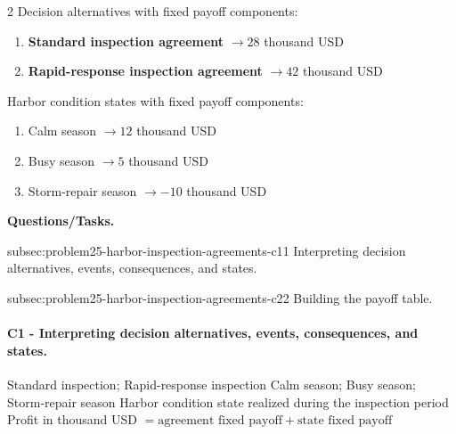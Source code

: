 	\begin{multicols}{2}
		Decision alternatives with fixed payoff components:
		\begin{enumerate}[label=\arabic*.]
			\item \textbf{Standard inspection agreement} $\to 28$ thousand USD
			\item \textbf{Rapid-response inspection agreement} $\to 42$ thousand USD
		\end{enumerate}

			\columnbreak

		Harbor condition states with fixed payoff components:
		\begin{enumerate}[label=\arabic*.]
			\item Calm season $\to 12$ thousand USD
			\item Busy season $\to 5$ thousand USD
			\item Storm-repair season $\to -10$ thousand USD
		\end{enumerate}
	\end{multicols}

	\textbf{Questions/Tasks.}
	\begin{enumerate}
		\CriterionTask
		{subsec:problem25-harbor-inspection-agreements-c1}{1}
		{Interpreting decision alternatives, events, consequences, and states.}

		\CriterionTask
		{subsec:problem25-harbor-inspection-agreements-c2}{2}
		{Building the payoff table.}
	\end{enumerate}

	\paragraph*{C1 - Interpreting decision alternatives, events, consequences, and states.}
	\label{subsec:problem25-harbor-inspection-agreements-c1}
	\DecisionElementsTable
	{Standard inspection; Rapid-response inspection}
	{Calm season; Busy season; Storm-repair season}
	{Harbor condition state realized during the inspection period}
	{Profit in thousand USD $= \text{agreement fixed payoff} + \text{state fixed payoff}$}


